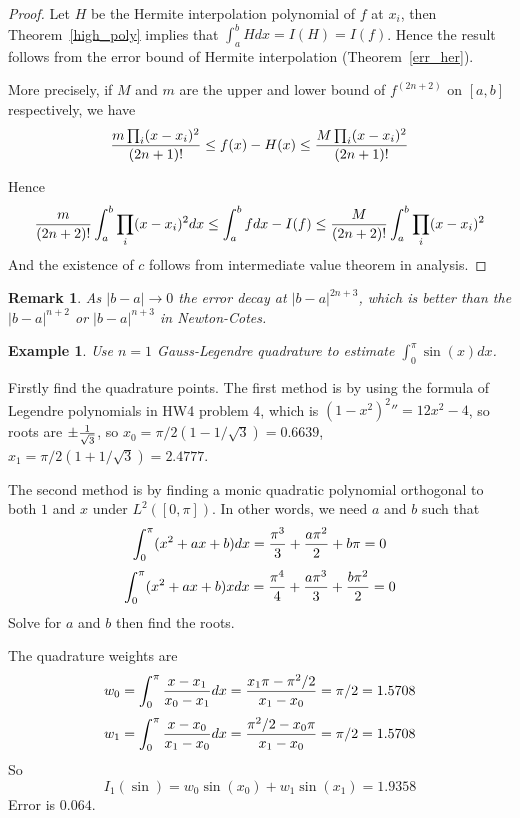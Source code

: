 \documentclass[20pt]{article} %
\theoremstyle{break}
\newtheorem{exa}[definition]{Example}
\newtheorem{rem}[definition]{Remark}
\begin{document}
  \begin{proof}
    Let $H$ be the Hermite interpolation polynomial of $f$ at $x_i$, then Theorem~\ref{high_poly} implies that $\int_a^bHdx=I(H)=I(f)$. Hence the result follows from the error bound of Hermite interpolation (Theorem~\ref{err_her}).

    \newpage

  More precisely, if $M$ and $m$ are the upper and lower bound of $f^{(2n+2)}$ on $[a, b]$ respectively, we have
    \[{m\prod_i(x-x_i)^2\over(2n+1)!}\leq f(x)-H(x)\leq {M\prod_i(x-x_i)^2\over(2n+1)!}\]

  Hence
    \[{m\over (2n+2)!}\int_a^b\prod_i(x-x_i)^2 dx\leq \int_a^bfdx-I(f)\leq {M\over (2n+2)!}\int_a^b\prod_i(x-x_i)^2\]
    And the existence of $c$ follows from intermediate value theorem in analysis.
  \end{proof}

  
  \begin{rem}
As $|b-a|\rightarrow 0$ the error decay at $|b-a|^{2n+3}$, which is better than the $|b-a|^{n+2}$ or $|b-a|^{n+3}$ in Newton-Cotes.
    \end{rem}
  
    \newpage

    \begin{exa} Use $n=1$ Gauss-Legendre quadrature to estimate $\int_0^\pi \sin(x)dx$.
    \end{exa}

    Firstly find the quadrature points. The first method is by using the formula of Legendre polynomials in HW4 problem 4, which is ${(1-x^2)^2}''=12x^2-4$, so roots are $\pm{1\over\sqrt{3}}$, so $x_0={\pi/2}(1-1/\sqrt{3})=0.6639$, $x_1={\pi/2}(1+1/\sqrt{3})=2.4777$.

    The second method is by finding a monic quadratic polynomial orthogonal to both $1$ and $x$ under $L^2([0, \pi])$. In other words, we need $a$ and $b$ such that
\[\int_0^\pi (x^2+ax+b)dx={\pi^3\over 3}+{a\pi^2\over 2}+b\pi=0\]
\[\int_0^\pi (x^2+ax+b)xdx={\pi^4\over 4}+{a\pi^3\over 3}+{b\pi^2\over 2}=0\]
Solve for $a$ and $b$ then find the roots.

     \newpage

    The quadrature weights are 
\[w_0=\int_0^\pi{x-x_1\over x_0-x_1}dx={x_1\pi-\pi^2/2\over x_1-x_0}=\pi/2=1.5708\]
\[w_1=\int_0^\pi{x-x_0\over x_1-x_0}dx={\pi^2/2-x_0\pi\over x_1-x_0}=\pi/2=1.5708\]
    So 
    \[I_1(\sin)=w_0\sin(x_0)+w_1\sin(x_1)=1.9358\]
    Error is $0.064$.

    \newpage
\end{document}
